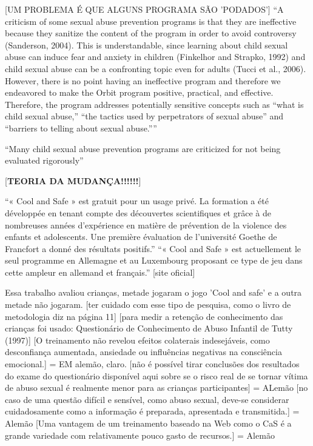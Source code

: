 [UM PROBLEMA É QUE ALGUNS PROGRAMA SÃO 'PODADOS']
``A criticism of some sexual abuse prevention programs is that they are ineffective because they sanitize the content of the program in order to avoid controversy (Sanderson, 2004). This is understandable, since learning about child sexual abuse can induce fear and anxiety in children (Finkelhor and Strapko, 1992) and child sexual abuse can be a confronting topic even for adults (Tucci et al., 2006). However, there is no point having an ineffective program and therefore we endeavored to make the Orbit program positive, practical, and effective. Therefore, the program addresses potentially sensitive concepts such as “what is child sexual abuse,” “the tactics used by perpetrators of sexual abuse” and “barriers to telling about sexual abuse.”'' \cite{dip2016advancing}

``Many child sexual abuse prevention programs are criticized for not being evaluated rigorously''\cite{dip2016advancing}

[\textbf{TEORIA DA MUDANÇA!!!!!!}]

``« Cool and Safe » est gratuit pour un usage privé. La formation a été développée en tenant compte des découvertes scientifiques et grâce à de nombreuses années d'expérience en matière de prévention de la violence des enfants et adolescents. Une première évaluation de l'université Goethe de Francfort a donné des résultats positifs.'' ``« Cool and Safe » est actuellement le seul programme en Allemagne et au Luxembourg proposant ce type de jeu dans cette ampleur en allemand et français.'' [site oficial]

Essa trabalho avaliou crianças, metade jogaram o jogo 'Cool and safe' e a outra metade não jogaram. \cite{fingerleabschlussbericht} [ter cuidado com esse tipo de pesquisa, como o livro de metodologia diz na página 11]
[para medir a retenção de conhecimento das crianças foi usado: Questionário de Conhecimento de Abuso Infantil de Tutty (1997)]
[O treinamento não revelou efeitos colaterais indesejáveis, como desconfiança aumentada, ansiedade ou influências negativas na consciência emocional.] = EM alemão, claro.
[não é possível tirar conclusões dos resultados do exame do questionário disponível aqui sobre se o risco real de se tornar vítima de abuso sexual é realmente menor para as crianças participantes] = ALemão
[no caso de uma questão difícil e sensível, como abuso sexual, deve-se considerar cuidadosamente como a informação é preparada, apresentada e transmitida.] = Alemão
[Uma vantagem de um treinamento baseado na Web como o CaS é a grande variedade com relativamente pouco gasto de recursos.] = Alemão

